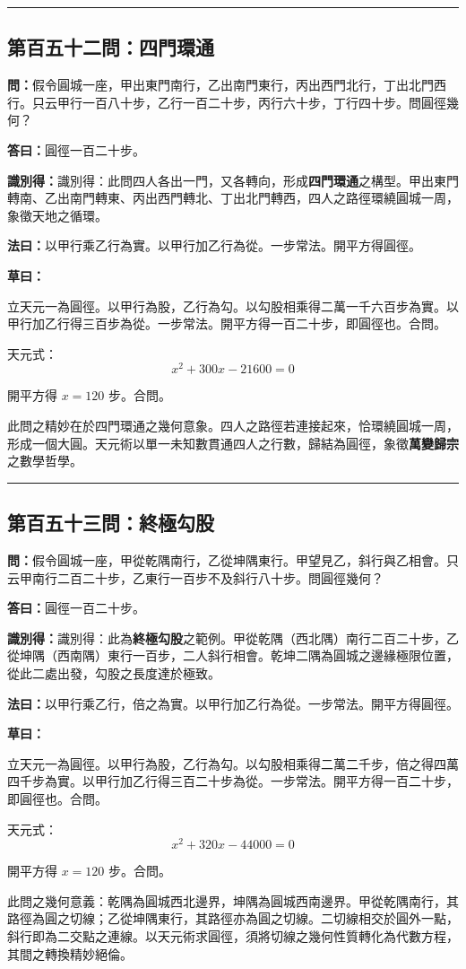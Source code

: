 \documentclass[11pt,a4paper]{article}
\newcommand{\longline}{\noindent\rule{\textwidth}{0.4pt}}
\newcommand{\wen}[1]{\par\noindent\textbf{\textcolor{probcolor}{問：}}{#1}\par}
\newcommand{\da}[1]{\par\noindent\textbf{\textcolor{anscolor}{答曰：}}{#1}\par}
\newcommand{\fayue}[1]{\par\noindent\textbf{\textcolor{methodcolor}{法曰：}}{#1}\par}
\newcommand{\caoyue}[1]{\par\noindent\textbf{草曰：}{#1}\par}
\newcommand{\zhi}[1]{\par\noindent\textbf{識別得：}{#1}\par}
\begin{document}
\vspace{0.5cm}
\longline

\subsection*{第百五十二問：四門環通}
\wen{假令圓城一座，甲出東門南行，乙出南門東行，丙出西門北行，丁出北門西行。只云甲行一百八十步，乙行一百二十步，丙行六十步，丁行四十步。問圓徑幾何？}

\da{圓徑一百二十步。}

\zhi{識別得：此問四人各出一門，又各轉向，形成\textbf{四門環通}之構型。甲出東門轉南、乙出南門轉東、丙出西門轉北、丁出北門轉西，四人之路徑環繞圓城一周，象徵天地之循環。}

\fayue{以甲行乘乙行為實。以甲行加乙行為從。一步常法。開平方得圓徑。}

\caoyue{
立天元一為圓徑。以甲行為股，乙行為勾。以勾股相乘得二萬一千六百步為實。以甲行加乙行得三百步為從。一步常法。開平方得一百二十步，即圓徑也。合問。

天元式：
$$x^2 + 300x - 21600 = 0$$

開平方得 $x = 120$ 步。合問。

此問之精妙在於四門環通之幾何意象。四人之路徑若連接起來，恰環繞圓城一周，形成一個大圓。天元術以單一未知數貫通四人之行數，歸結為圓徑，象徵\textbf{萬變歸宗}之數學哲學。
}

\vspace{0.5cm}
\longline

\subsection*{第百五十三問：終極勾股}
\wen{假令圓城一座，甲從乾隅南行，乙從坤隅東行。甲望見乙，斜行與乙相會。只云甲南行二百二十步，乙東行一百步不及斜行八十步。問圓徑幾何？}

\da{圓徑一百二十步。}

\zhi{識別得：此為\textbf{終極勾股}之範例。甲從乾隅（西北隅）南行二百二十步，乙從坤隅（西南隅）東行一百步，二人斜行相會。乾坤二隅為圓城之邊緣極限位置，從此二處出發，勾股之長度達於極致。}

\fayue{以甲行乘乙行，倍之為實。以甲行加乙行為從。一步常法。開平方得圓徑。}

\caoyue{
立天元一為圓徑。以甲行為股，乙行為勾。以勾股相乘得二萬二千步，倍之得四萬四千步為實。以甲行加乙行得三百二十步為從。一步常法。開平方得一百二十步，即圓徑也。合問。

天元式：
$$x^2 + 320x - 44000 = 0$$

開平方得 $x = 120$ 步。合問。

此問之幾何意義：乾隅為圓城西北邊界，坤隅為圓城西南邊界。甲從乾隅南行，其路徑為圓之切線；乙從坤隅東行，其路徑亦為圓之切線。二切線相交於圓外一點，斜行即為二交點之連線。以天元術求圓徑，須將切線之幾何性質轉化為代數方程，其間之轉換精妙絕倫。
}
\end{document}
